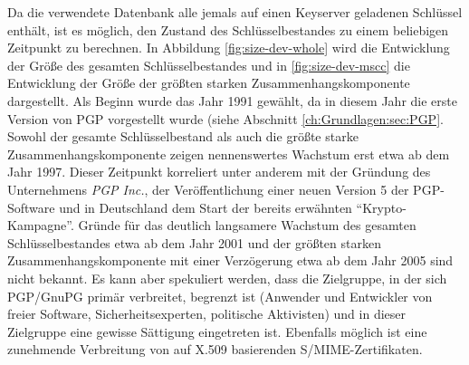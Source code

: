 Da die verwendete Datenbank alle jemals auf einen Keyserver geladenen
Schlüssel enthält, ist es möglich, den Zustand des Schlüsselbestandes
zu einem beliebigen Zeitpunkt zu berechnen. In Abbildung
\ref{fig:size-dev-whole} wird die Entwicklung der Größe des gesamten
Schlüsselbestandes und in \ref{fig:size-dev-mscc} die Entwicklung der
Größe der größten starken Zusammenhangskomponente dargestellt. Als
Beginn wurde das Jahr 1991 gewählt, da in diesem Jahr die erste
Version von PGP vorgestellt wurde (siehe Abschnitt
\ref{ch:Grundlagen:sec:PGP}. Sowohl der gesamte Schlüsselbestand als
auch die größte starke Zusammenhangskomponente zeigen nennenswertes
Wachstum erst etwa ab dem Jahr 1997. Dieser Zeitpunkt korreliert unter
anderem mit der Gründung des Unternehmens \emph{PGP Inc.}, der
Veröffentlichung einer neuen Version 5 der PGP-Software und in
Deutschland dem Start der bereits erwähnten
``Krypto-Kampagne''. Gründe für das deutlich langsamere Wachstum des
gesamten Schlüsselbestandes etwa ab dem Jahr 2001 und der größten
starken Zusammenhangskomponente mit einer Verzögerung etwa ab dem Jahr
2005 sind nicht bekannt. Es kann aber spekuliert werden, dass die
Zielgruppe, in der sich PGP/GnuPG prim\"ar verbreitet, begrenzt ist
(Anwender und Entwickler von freier Software, Sicherheitsexperten,
politische Aktivisten) und in dieser Zielgruppe eine gewisse
S\"attigung eingetreten ist. Ebenfalls m\"oglich ist eine zunehmende
Verbreitung von auf X.509 basierenden S/MIME-Zertifikaten.


